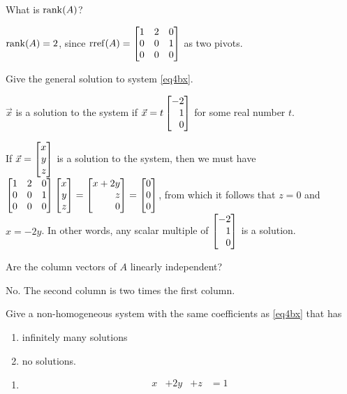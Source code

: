 	\begin{parts}
		\item What is $\operatorname{rank}(A)$?
			\begin{solution}
				$\operatorname{rank}(A)=2$, since $\rref(A)=\mat{1&2&0\\0&0&1\\0&0&0}$ as two pivots.
			\end{solution}
		\item Give the general solution to system \eqref{eq4bx}.
			\begin{solution}
				$\vec x$ is a solution to the system if
				$\vec x=t\mat{-2\\1\\0}$ for some real number $t$.

				If $\vec x=\mat{x\\y\\z}$ is a solution to the system, then we
				must have $\mat{1&2&0\\0&0&1\\0&0&0}\mat{x\\y\\z}=\mat{x+2y\\z\\0}=\mat{0\\0\\0}$,
				from which it follows that $z=0$ and $x=-2y$. In other words,
				any scalar multiple of $\mat{-2\\1\\0}$ is a solution.
			\end{solution}
		\item Are the column vectors of $A$ linearly independent?
			\begin{solution}
				No. The second column is two times the first column.
			\end{solution}
		\item Give a non-homogeneous system with the same coefficients as \eqref{eq4bx} that has
			\begin{enumerate}
				\item infinitely many solutions
				\item no solutions.
			\end{enumerate}
			\begin{solution}
				\begin{enumerate}
					\item
						\begin{equation*}
							\begin{array}{llll}
								x&+2y&+z &= 1\\

\end{array}
\end{equation*}
\end{enumerate}
\end{solution}
\end{parts}
